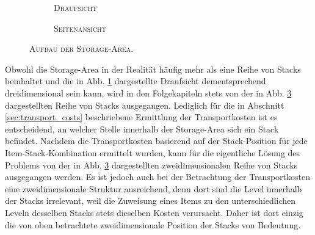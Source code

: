 \begin{figure}[H]
\centering

\begin{subfigure}[b]{\textwidth}
\centering
{}
\caption{\textsc{Draufsicht}}
\label{fig:topview}
\end{subfigure}
\par\bigskip
\begin{subfigure}[b]{\textwidth}
\centering
{}
\caption{\textsc{Seitenansicht}}
\label{fig:sideview}
\end{subfigure}

\caption{\textsc{Aufbau der Storage-Area}.}
\label{fig:storage_area}
\end{figure}

\pagebreak

Obwohl die Storage-Area in der Realität häufig mehr als eine Reihe von Stacks beinhaltet und die in
Abb. \ref{fig:topview} dargestellte Draufsicht dementsprechend dreidimensional sein kann,
wird in den Folgekapiteln stets von der in Abb. \ref{fig:storage_area} dargestellten Reihe von Stacks ausgegangen.
Lediglich für die in Abschnitt \ref{sec:transport_costs} beschriebene Ermittlung der Transportkosten ist es entscheidend,
an welcher Stelle innerhalb der Storage-Area sich ein Stack befindet. Nachdem die Transportkosten basierend auf der
Stack-Position für jede Item-Stack-Kombination ermittelt wurden, kann für die eigentliche Lösung des Problems von
der in Abb. \ref{fig:storage_area} dargestellten zweidimensionalen Reihe von Stacks ausgegangen werden.
Es ist jedoch auch bei der Betrachtung der Transportkosten eine zweidimensionale Struktur ausreichend, denn dort sind
die Level innerhalb der Stacks irrelevant, weil die Zuweisung eines Items zu den unterschiedlichen Leveln
desselben Stacks stets dieselben Kosten verursacht. Daher ist dort einzig die von oben betrachtete zweidimensionale
Position der Stacks von Bedeutung.

